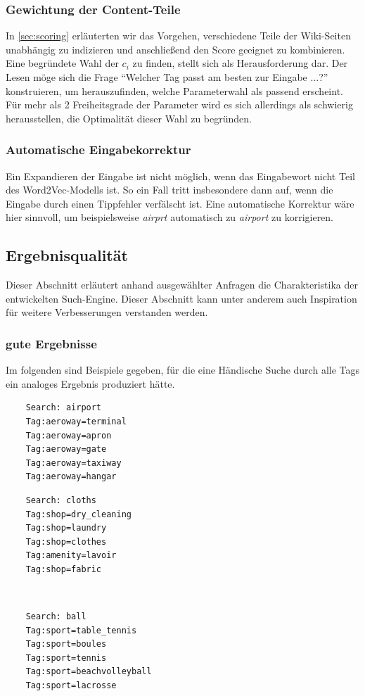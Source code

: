 \documentclass[12pt,pdftex,a4paper]{article}
\begin{document}
\subsubsection{Gewichtung der Content-Teile}
\label{sec:gliederungContent}
In \autoref{sec:scoring} erläuterten wir das Vorgehen, verschiedene Teile der Wiki-Seiten unabhängig zu indizieren und anschließend den Score geeignet zu kombinieren. Eine begründete Wahl der $c_i$ zu finden, stellt sich als Herausforderung dar. Der Lesen möge sich die Frage ``Welcher Tag passt am besten zur Eingabe ...?'' konstruieren, um herauszufinden, welche Parameterwahl als passend erscheint. \\
Für mehr als 2 Freiheitsgrade der Parameter wird es sich allerdings als schwierig herausstellen, die Optimalität dieser Wahl zu begründen.
\subsubsection{Automatische Eingabekorrektur}
Ein Expandieren der Eingabe ist nicht möglich, wenn das Eingabewort nicht Teil des Word2Vec-Modells ist. So ein Fall tritt insbesondere dann auf, wenn die Eingabe durch einen Tippfehler verfälscht ist. Eine automatische Korrektur wäre hier sinnvoll, um beispielsweise \textit{airprt} automatisch zu \textit{airport} zu korrigieren.


\subsection{Ergebnisqualität}
Dieser Abschnitt erläutert anhand ausgewählter Anfragen die Charakteristika der entwickelten Such-Engine. Dieser Abschnitt kann unter anderem auch Inspiration für weitere Verbesserungen verstanden werden.
\subsubsection{gute Ergebnisse}
Im folgenden sind Beispiele gegeben, für die eine Händische Suche durch alle Tags ein analoges Ergebnis produziert hätte.\\
\begin{minipage}[t]{0.45\linewidth}
\begin{lstlisting}
	Search: airport
	Tag:aeroway=terminal
	Tag:aeroway=apron
	Tag:aeroway=gate
	Tag:aeroway=taxiway
	Tag:aeroway=hangar
\end{lstlisting}
\end{minipage}
\begin{minipage}[t]{0.45\linewidth}
\begin{lstlisting}
	Search: cloths
	Tag:shop=dry_cleaning
	Tag:shop=laundry
	Tag:shop=clothes
	Tag:amenity=lavoir
	Tag:shop=fabric
\end{lstlisting}
\end{minipage}
\\
\begin{minipage}[t]{0.45\linewidth}
	\begin{lstlisting}
	Search: ball
	Tag:sport=table_tennis
	Tag:sport=boules
	Tag:sport=tennis
	Tag:sport=beachvolleyball
	Tag:sport=lacrosse
	\end{lstlisting}
\end{minipage}
\end{document}
